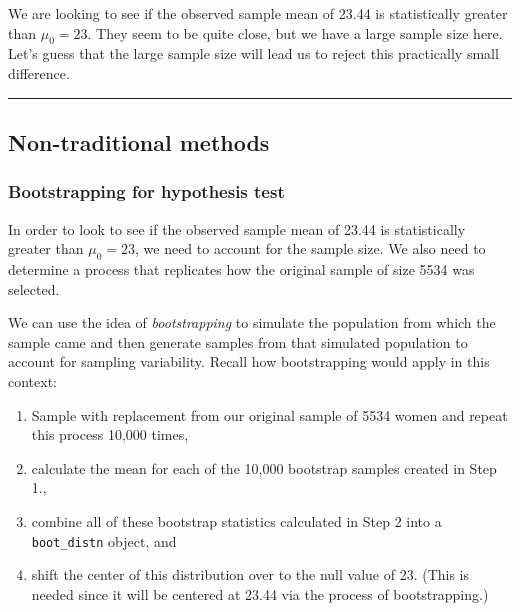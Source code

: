 \documentclass[12pt, krantz2,]{krantz}
\providecommand{\tightlist}{%
  \setlength{\itemsep}{0pt}\setlength{\parskip}{0pt}}
\begin{document}
We are looking to see if the observed sample mean of 23.44 is statistically greater than \(\mu_0 = 23\). They seem to be quite close, but we have a large sample size here. Let's guess that the large sample size will lead us to reject this practically small difference.

\begin{center}\rule{0.5\linewidth}{\linethickness}\end{center}

\hypertarget{non-traditional-methods}{%
\subsection{Non-traditional methods}\label{non-traditional-methods}}

\hypertarget{bootstrapping-for-hypothesis-test}{%
\subsubsection*{Bootstrapping for hypothesis test}\label{bootstrapping-for-hypothesis-test}}


In order to look to see if the observed sample mean of 23.44 is statistically greater than \(\mu_0 = 23\), we need to account for the sample size. We also need to determine a process that replicates how the original sample of size 5534 was selected.

We can use the idea of \emph{bootstrapping} to simulate the population from which the sample came and then generate samples from that simulated population to account for sampling variability. Recall how bootstrapping would apply in this context:

\begin{enumerate}
\def\labelenumi{\arabic{enumi}.}
\tightlist
\item
  Sample with replacement from our original sample of 5534 women and repeat this process 10,000 times,
\item
  calculate the mean for each of the 10,000 bootstrap samples created in Step 1.,
\item
  combine all of these bootstrap statistics calculated in Step 2 into a \texttt{boot\_distn} object, and
\item
  shift the center of this distribution over to the null value of 23. (This is needed since it will be centered at 23.44 via the process of bootstrapping.)
\end{enumerate}
\end{document}
